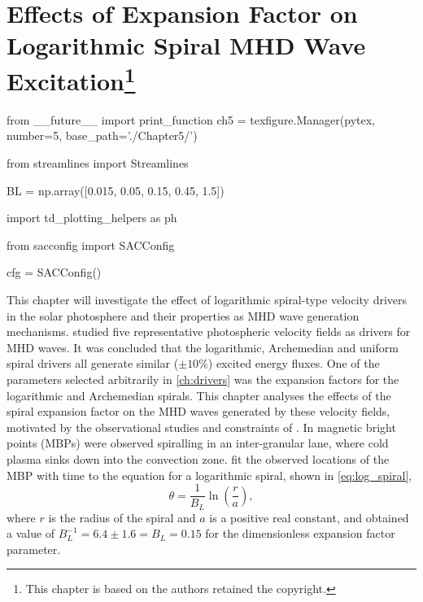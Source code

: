 
\chapter[]{Effects of Expansion Factor on Logarithmic Spiral MHD Wave Excitation\footnote{This chapter is based on \cite{mumford2015a} the authors retained the copyright.}}\label{ch:expfac}

\begin{pycode}[chapter5]
from __future__ import print_function
ch5 = texfigure.Manager(pytex, number=5, base_path='./Chapter5/')

from streamlines import Streamlines

BL = np.array([0.015, 0.05, 0.15, 0.45, 1.5])

import td_plotting_helpers as ph

from sacconfig import SACConfig

cfg = SACConfig()
\end{pycode}

This chapter will investigate the effect of logarithmic spiral-type velocity drivers in the solar photosphere and their properties as MHD wave generation mechanisms.
 studied five representative photospheric velocity fields as drivers for MHD waves.
It was concluded that the logarithmic, Archemedian and uniform spiral drivers all generate similar ($\pm 10\%$) excited energy fluxes.
One of the parameters selected arbitrarily in \cref{ch:drivers} was the expansion factors for the logarithmic and Archemedian spirals.
This chapter analyses the effects of the spiral expansion factor on the MHD waves generated by these velocity fields, motivated by the observational studies and constraints of \cite{bonet2008}.
In \cite{bonet2008} magnetic bright points (MBPs) were observed spiralling in an inter-granular lane, where cold plasma sinks down into the convection zone.
\cite{bonet2008} fit the observed locations of the MBP with time to the equation for a logarithmic spiral, shown in \cref{eq:log_spiral},
\begin{equation}
\theta = \frac{1}{B_L}\ln\left(\frac{r}{a}\right),
\label{eq:log_spiral}
\end{equation}
where $r$ is the radius of the spiral and $a$ is a positive real constant, and obtained a value of $B_L^{-1} = 6.4 \pm 1.6 = B_L = 0.15$ for the dimensionless expansion factor parameter.

